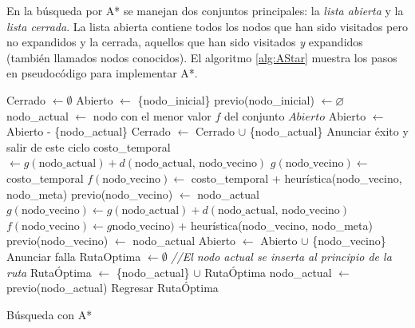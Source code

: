 \documentclass[a4paper]{article}
\begin{document}
En la búsqueda por A* se manejan dos conjuntos principales: la \textit{lista abierta} y la \textit{lista cerrada}. La lista abierta contiene todos los nodos que han sido visitados pero no expandidos y la cerrada, aquellos que han sido visitados \textit{y} expandidos (también llamados nodos conocidos). El algoritmo \ref{alg:AStar} muestra los pasos en pseudocódigo para implementar A*. 
\begin{algorithm}
\DontPrintSemicolon
{}
Cerrado $\leftarrow \emptyset$\;
Abierto $\leftarrow$ \{nodo\_inicial\}\;
previo(nodo\_inicial) $\leftarrow \varnothing$\;
{
  nodo\_actual $\leftarrow$ nodo con el menor valor $f$ del conjunto $Abierto$\;
  Abierto $\leftarrow$ Abierto - \{nodo\_actual\}\;
  Cerrado $\leftarrow$ Cerrado $\cup$ \{nodo\_actual\}\;
  {
    Anunciar éxito y salir de este ciclo\;
  }
  {
    {
      costo\_temporal $\leftarrow g(\textrm{nodo\_actual}) + d(\textrm{nodo\_actual, nodo\_vecino})$\;
      {
        $g(\textrm{nodo\_vecino})\leftarrow$ costo\_temporal\;
        $f(\textrm{nodo\_vecino})\leftarrow$ costo\_temporal + heurística(nodo\_vecino, nodo\_meta)\;
        previo(nodo\_vecino) $\leftarrow$ nodo\_actual\;
      }
    }
    {
      $g(\textrm{nodo\_vecino})\leftarrow g(\textrm{nodo\_actual}) + d(\textrm{nodo\_actual, nodo\_vecino})$\;
      $f(\textrm{nodo\_vecino})\leftarrow g\textrm{nodo\_vecino})$  + heurística(nodo\_vecino, nodo\_meta)\;
      previo(nodo\_vecino) $\leftarrow$ nodo\_actual\;
      Abierto $\leftarrow$ Abierto $\cup$ \{nodo\_vecino\}\; 
    }
  }
}
{
  Anunciar falla\;
}
{
  RutaOptima $\leftarrow\emptyset$ \;
  {
    \textit{//El nodo actual se inserta al principio de la ruta}\;
    RutaÓptima $\leftarrow$ \{nodo\_actual\} $\cup$ RutaÓptima \;
    nodo\_actual $\leftarrow$ previo(nodo\_actual)\;
  }
  Regresar RutaÓptima
}
\caption{Búsqueda con A*}
\label{alg:AStar}
\end{algorithm}
\end{document}
